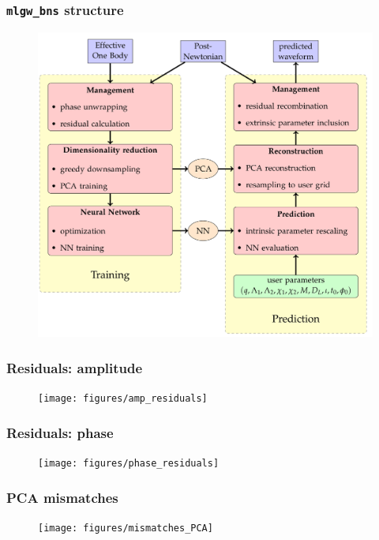 \documentclass{beamer}
\begin{document}
\begin{frame}
    \frametitle{\texttt{mlgw\_bns} structure}
    \vspace*{-.3cm}
    \begin{figure}[ht]
    \centering
    \includegraphics[width=.775\textwidth]{figures/flowchart}
    \label{fig:flowchart}
    \end{figure}
\end{frame}

\begin{frame}
    \frametitle{Residuals: amplitude}
    \begin{figure}[ht]
    \centering
    \texttt{[image: figures/amp\_residuals]}
    \label{fig:amp_residuals}
    \end{figure}
\end{frame}

\begin{frame}
    \frametitle{Residuals: phase}
    \begin{figure}[ht]
    \centering
    \texttt{[image: figures/phase\_residuals]}
    \label{fig:phase_residuals}
    \end{figure}
\end{frame}


\begin{frame}
    \frametitle{PCA mismatches}
    \begin{figure}[ht]
    \centering
    \texttt{[image: figures/mismatches\_PCA]}
    \label{fig:mismatches_PCA}
    \end{figure}
\end{frame}
\end{document}

